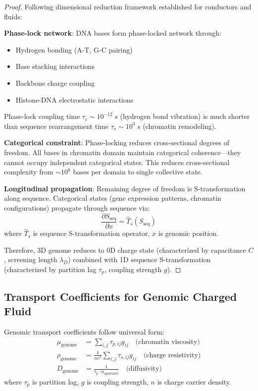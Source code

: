 \begin{proof}
Following dimensional reduction framework established for conductors and fluids:

\textbf{Phase-lock network}: DNA bases form phase-locked network through:
\begin{itemize}
\item Hydrogen bonding (A-T, G-C pairing)
\item Base stacking interactions
\item Backbone charge coupling
\item Histone-DNA electrostatic interactions
\end{itemize}
Phase-lock coupling time $\tau_c \sim 10^{-12}$ s (hydrogen bond vibration) is much shorter than sequence rearrangement time $\tau_s \sim 10^3$ s (chromatin remodeling).

\textbf{Categorical constraint}: Phase-locking reduces cross-sectional degrees of freedom. All bases in chromatin domain maintain categorical coherence—they cannot occupy independent categorical states. This reduces cross-sectional complexity from $\sim 10^6$ bases per domain to single collective state.

\textbf{Longitudinal propagation}: Remaining degree of freedom is S-transformation along sequence. Categorical states (gene expression patterns, chromatin configurations) propagate through sequence via:
\begin{equation}
\frac{\partial S_{\text{seq}}}{\partial x} = \hat{T}_s(S_{\text{seq}})
\end{equation}
where $\hat{T}_s$ is sequence S-transformation operator, $x$ is genomic position.

Therefore, 3D genome reduces to 0D charge state (characterized by capacitance $C$, screening length $\lambda_D$) combined with 1D sequence S-transformation (characterized by partition lag $\tau_p$, coupling strength $g$).
\end{proof}

\subsection{Transport Coefficients for Genomic Charged Fluid}

\begin{theorem}
\label{thm:genomic_transport}
Genomic transport coefficients follow universal form:
\begin{align}
\mu_{\text{genome}} &= \sum_{i,j} \tau_{p,ij} g_{ij} \quad \text{(chromatin viscosity)} \\
\rho_{\text{genome}} &= \frac{1}{ne^2}\sum_{i,j} \tau_{s,ij} g_{ij} \quad \text{(charge resistivity)} \\
D_{\text{genome}} &= \frac{1}{\tau_p \cdot n_{\text{apertures}}} \quad \text{(diffusivity)}
\end{align}
where $\tau_p$ is partition lag, $g$ is coupling strength, $n$ is charge carrier density.
\end{theorem}

